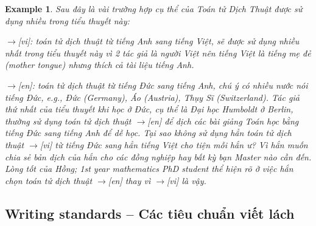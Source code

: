 \documentclass[12pt,twoside]{book}
\newtheorem{example}{Example}
\begin{document}
\begin{example}
	Sau đây là vài trường hợp cụ thể của Toán tử Dịch Thuật được sử dụng nhiều trong tiểu thuyết này:
	\item {\sf[en]$\to$[vi]}: toán tử dịch thuật từ tiếng Anh sang tiếng Việt, sẽ được sử dụng nhiều nhất trong tiểu thuyết này vì 2 tác giả là người Việt nên tiếng Việt là tiếng mẹ đẻ (mother tongue) nhưng thích cả tài liệu tiếng Anh.
	\item {\sf[de]$\to$[en]}: toán tử dịch thuật từ tiếng Đức sang tiếng Anh, chú ý có nhiều nước nói tiếng Đức, e.g., Đức (Germany), Áo (Austria), Thụy Sĩ (Switzerland). Tác giả thứ nhất của tiểu thuyết khi học ở Đức, cụ thể là Đại học Humboldt ở Berlin, thường sử dụng toán tử dịch thuật {\sf[de]$\to$[en]} để dịch các bài giảng Toán học bằng tiếng Đức sang tiếng Anh để dễ học. Tại sao không sử dụng hẳn toán tử dịch thuật {\sf[de]$\to$[vi]} từ tiếng Đức sang hẳn tiếng Việt cho tiện mỗi hắn ư? Vì hắn muốn chia sẻ bản dịch của hắn cho các đồng nghiệp hay bất kỳ bạn Master nào cần đến. Lòng tốt của {\sf Hồng; 1st year mathematics PhD student} thể hiện rõ ở việc hắn chọn toán tử dịch thuật {\sf[de]$\to$[en]} thay vì {\sf[de]$\to$[vi]} là vậy.
\end{example}


\subsection{Writing standards -- Các tiêu chuẩn viết lách}
\end{document}
